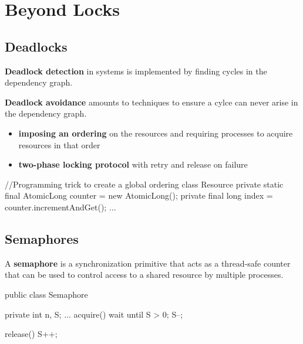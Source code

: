 \section{Beyond Locks}

\subsection{Deadlocks}

\begin{remark}
    \textbf{Deadlock detection} in systems is implemented by finding cycles in the dependency graph.
\end{remark}

\begin{remark}
    \textbf{Deadlock avoidance} amounts to techniques to ensure a cylce can never arise in the dependency graph. 
    \begin{itemize}
        \item \textbf{imposing an ordering} on the resources and requiring processes to acquire resources in that order
        \item \textbf{two-phase locking protocol} with retry and release on failure
    \end{itemize}
\end{remark}

\begin{codeexample}
//Programming trick to create a global ordering
class Resource {
    private static final AtomicLong counter = new AtomicLong();
    private final long index = counter.incrementAndGet();
    ...
}
\end{codeexample}

\subsection{Semaphores}

\begin{definition}
    A \textbf{semaphore} is a synchronization primitive that acts as a thread-safe counter that can be used to control access to a shared resource by multiple processes.
\end{definition}

\begin{codeexample}
public class Semaphore {
    private int n, S;
    ...
    acquire() {
        wait until S > 0;
        S--;
    }
    
    release() {
        S++;
    }
}
\end{codeexample}

